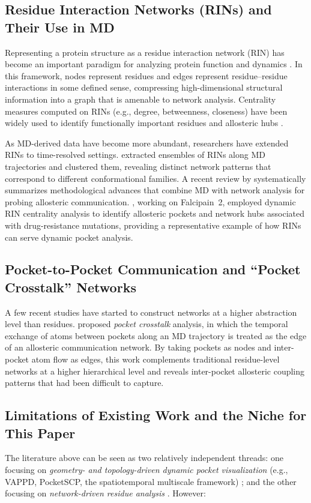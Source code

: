 \documentclass[11pt,a4paper]{article}
\begin{document}
\subsection{Residue Interaction Networks (RINs) and Their Use in MD}
Representing a protein structure as a residue interaction network
(RIN) has become an important paradigm for analyzing protein function
and dynamics \citep{vishveshwara2009modeling}. In this framework,
nodes represent residues and edges represent residue--residue
interactions in some defined sense, compressing high-dimensional
structural information into a graph that is amenable to network
analysis. Centrality measures computed on RINs (e.g., degree,
betweenness, closeness) have been widely used to identify
functionally important residues and allosteric hubs
\citep{centrality2021highlight}.

As MD-derived data have become more abundant, researchers have
extended RINs to time-resolved settings.
\citet{rin_clustering_ensembles} extracted ensembles of RINs along
MD trajectories and clustered them, revealing distinct network
patterns that correspond to different conformational families. A
recent review by \citet{bernetti2024probing} systematically
summarizes methodological advances that combine MD with network
analysis for probing allosteric communication.
\citet{sheikamamuddy2021allosteric}, working on Falcipain~2, employed
dynamic RIN centrality analysis to identify allosteric pockets and
network hubs associated with drug-resistance mutations, providing a
representative example of how RINs can serve dynamic pocket analysis.

\subsection{Pocket-to-Pocket Communication and ``Pocket Crosstalk''
            Networks}
A few recent studies have started to construct networks at a higher
abstraction level than residues. \citet{lasala2017pocket} proposed
\emph{pocket crosstalk} analysis, in which the temporal exchange of
atoms between pockets along an MD trajectory is treated as the edge
of an allosteric communication network. By taking pockets as nodes
and inter-pocket atom flow as edges, this work complements
traditional residue-level networks at a higher hierarchical level
and reveals inter-pocket allosteric coupling patterns that had been
difficult to capture.

\subsection{Limitations of Existing Work and the Niche for This
            Paper}
The literature above can be seen as two relatively independent
threads: one focusing on \emph{geometry- and topology-driven dynamic
pocket visualization} (e.g., VAPPD, PocketSCP, the spatiotemporal
multiscale framework)
\citep{zhan2020spatiotemporal,guo2022vappd,guo2025pocketscp};
and the other focusing on \emph{network-driven residue analysis}
\citep{vishveshwara2009modeling,centrality2021highlight,
rin_clustering_ensembles,bernetti2024probing}. However:
\end{document}
